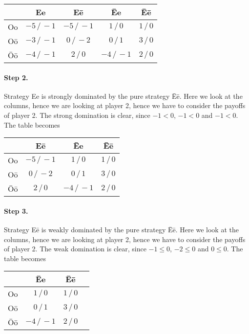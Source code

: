 \begin{enumerate}[label=\alph*.]
	      \begin{table}[h]
	      	\centering
	      	\begin{tabular}{c|cccc}
	      		       & Ee             & E\=e           & \=Ee           & \=E\=e       \\ \hline
	      		Oo     & $-5\, / \, -1$ & $-5\, / \, -1$ & $1\, / \, 0$   & $1\, / \, 0$ \\
	      		O\=o   & $-3\, / \, -1$ & $0\, / \, -2$  & $0\, / \, 1$   & $3\, / \, 0$ \\
	      		\=O\=o & $-4\, / \, -1$ & $2\, / \, 0$   & $-4\, / \, -1$ & $2\, / \, 0$
	      	\end{tabular}
	      \end{table}

	      \paragraph{Step 2.} Strategy Ee is strongly dominated by the pure strategy \=E\=e. Here we look at the columns, hence we are looking at player 2, hence we have to consider the payoffs of player 2. The strong domination is clear, since $-1 < 0$, $-1 < 0$ and $-1 < 0$.
	      The table becomes

	      \begin{table}[h]
	      	\centering
	      	\begin{tabular}{c|ccc}
	      		       & E\=e           & \=Ee           & \=E\=e       \\ \hline
	      		Oo     & $-5\, / \, -1$ & $1\, / \, 0$   & $1\, / \, 0$ \\
	      		O\=o   & $0\, / \, -2$  & $0\, / \, 1$   & $3\, / \, 0$ \\
	      		\=O\=o & $2\, / \, 0$   & $-4\, / \, -1$ & $2\, / \, 0$
	      	\end{tabular}
	      \end{table}

	      \paragraph{Step 3.} Strategy E\=e is weakly dominated by the pure strategy \=E\=e. Here we look at the columns, hence we are looking at player 2, hence we have to consider the payoffs of player 2. The weak domination is clear, since $-1 \leq 0$, $-2 \leq 0$ and $0 \leq 0$.
	      The table becomes

	      \begin{table}[h]
	      	\centering
	      	\begin{tabular}{c|ccc}
	      		       & \=Ee           & \=E\=e       \\ \hline
	      		Oo     & $1\, / \, 0$   & $1\, / \, 0$ \\
	      		O\=o   & $0\, / \, 1$   & $3\, / \, 0$ \\
	      		\=O\=o & $-4\, / \, -1$ & $2\, / \, 0$
	      	\end{tabular}
	      \end{table}


\end{enumerate}
